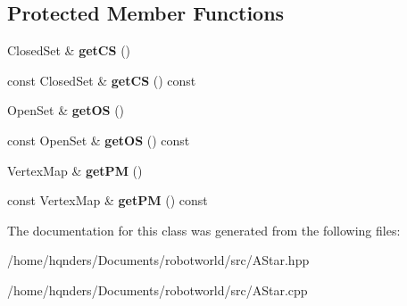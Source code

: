 \subsection*{Protected Member Functions}
\begin{DoxyCompactItemize}
\item 
Closed\+Set \& {\bfseries get\+CS} ()\hypertarget{class_path_algorithm_1_1_a_star_a4cb2a6c928a01fcac02533500bd8ace5}{}\label{class_path_algorithm_1_1_a_star_a4cb2a6c928a01fcac02533500bd8ace5}

\item 
const Closed\+Set \& {\bfseries get\+CS} () const \hypertarget{class_path_algorithm_1_1_a_star_a420e1ac8824a265dc2272c7e50899322}{}\label{class_path_algorithm_1_1_a_star_a420e1ac8824a265dc2272c7e50899322}

\item 
Open\+Set \& {\bfseries get\+OS} ()\hypertarget{class_path_algorithm_1_1_a_star_a48e23107ffca02392bdf2439775baecf}{}\label{class_path_algorithm_1_1_a_star_a48e23107ffca02392bdf2439775baecf}

\item 
const Open\+Set \& {\bfseries get\+OS} () const \hypertarget{class_path_algorithm_1_1_a_star_af5ea4271f9318edaa68d8030e35d0cf1}{}\label{class_path_algorithm_1_1_a_star_af5ea4271f9318edaa68d8030e35d0cf1}

\item 
Vertex\+Map \& {\bfseries get\+PM} ()\hypertarget{class_path_algorithm_1_1_a_star_a4bb6718fd07f503ff836c5cdccd74236}{}\label{class_path_algorithm_1_1_a_star_a4bb6718fd07f503ff836c5cdccd74236}

\item 
const Vertex\+Map \& {\bfseries get\+PM} () const \hypertarget{class_path_algorithm_1_1_a_star_a021ff514f018ce9ec7db705578a210d4}{}\label{class_path_algorithm_1_1_a_star_a021ff514f018ce9ec7db705578a210d4}

\end{DoxyCompactItemize}


The documentation for this class was generated from the following files\+:\begin{DoxyCompactItemize}
\item 
/home/hqnders/\+Documents/robotworld/src/A\+Star.\+hpp\item 
/home/hqnders/\+Documents/robotworld/src/A\+Star.\+cpp\end{DoxyCompactItemize}
